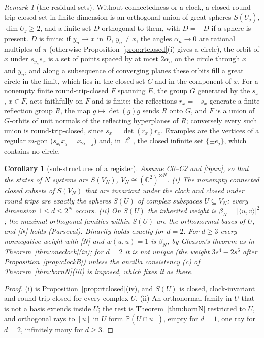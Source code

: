 \documentclass[aps,pra,onecolumn,superscriptaddress,nofootinbib,10pt]{revtex4-2}
\newtheorem{corollary}[theorem]{Corollary}
\theoremstyle{definition}
\theoremstyle{remark}
\newtheorem{remark}[theorem]{Remark}
\newcommand{\C}{\mathbb{C}}
\newcommand{\ip}[2]{\langle #1,#2\rangle}
\begin{document}
\begin{remark}[the residual sets]\label{rem:residual}
Without connectedness or a clock, a closed round-trip-closed set in finite dimension is an orthogonal union of
great spheres $S(U_j)$, $\dim U_j\ge2$, and a finite set $D$ orthogonal to them, with $D=-D$ if a sphere is present.
$D$ is finite: if $y_n\to x$ in $D$, $y_n\ne x$, the angles $\alpha_n\to0$ are rational multiples of $\pi$ (otherwise
Proposition~\ref{prop:rtclosed}(i) gives a circle), the orbit of $x$ under $s_{y_n}s_x$ is a set of points spaced by at most
$2\alpha_n$ on the circle through $x$ and $y_n$, and along a subsequence of converging planes these orbits fill a
great circle in the limit, which lies in the closed set $C$ and in the component of $x$.
For a nonempty finite round-trip-closed $F$ spanning $E$, the group $G$ generated by the $s_x$, $x\in F$, acts
faithfully on $F$ and is finite; the reflections $r_x=-s_x$ generate a finite reflection group $R$, the map
$g\mapsto\det(g)g$ sends $R$ onto $G$, and $F$ is a union of $G$-orbits of unit normals of the reflecting hyperplanes
of $R$; conversely every such union is round-trip-closed, since $s_x=\det(r_x)r_x$.  Examples are the vertices of a
regular $m$-gon ($s_{x_i}x_j=x_{2i-j}$) and, in $\ell^2$, the closed infinite set $\{\pm e_j\}$, which contains no circle.
\end{remark}

\begin{corollary}[sub-structures of a register]\label{cor:substructure}
Assume C0--C2 and [Span], so that the states of $N$ systems are $S(V_N)$, $V_N\cong(\C^2)^{\otimes N}$.
(i) The nonempty connected closed subsets of $S(V_N)$ that are invariant under the clock and closed under
round trips are exactly the spheres $S(U)$ of complex subspaces $U\subseteq V_N$; every dimension $1\le d\le2^N$ occurs.
(ii) On $S(U)$ the inherited weight is $\beta_N=\lvert\ip uv\rvert^2$; the maximal orthogonal families within $S(U)$ are the
orthonormal bases of $U$, and [N] holds (Parseval).  Binarity holds exactly for $d=2$.  For $d\ge3$ every nonnegative
weight with [N] and $w(u,u)=1$ is $\beta_N$, by Gleason's theorem as in Theorem~\ref{thm:oneclock}(iv); for $d=2$ it is
not unique (the weight $3s^4-2s^6$ after Proposition~\ref{prop:clockB}) unless the ancilla consistency (c) of
Theorem~\ref{thm:bornN}(iii) is imposed, which fixes it as there.
\end{corollary}
\begin{proof}
(i) is Proposition~\ref{prop:rtclosed}(iv), and $S(U)$ is closed, clock-invariant and round-trip-closed for every
complex $U$.  (ii) An orthonormal family in $U$ that is not a basis extends inside $U$; the rest is
Theorem~\ref{thm:bornN} restricted to $U$, and orthogonal rays to $[u]$ in $U$ form $\mathbb P(U\cap u^\perp)$, empty for
$d=1$, one ray for $d=2$, infinitely many for $d\ge3$.
\end{proof}
\end{document}
